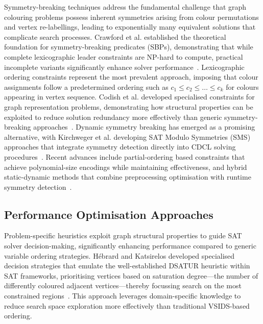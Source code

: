 Symmetry-breaking techniques address the fundamental challenge that graph colouring problems possess inherent symmetries arising from colour permutations and vertex re-labellings, leading to exponentially many equivalent solutions that complicate search processes. Crawford et al. established the theoretical foundation for symmetry-breaking predicates (SBPs), demonstrating that while complete lexicographic leader constraints are NP-hard to compute, practical incomplete variants significantly enhance solver performance~\cite{crawford1996symmetry}. Lexicographic ordering constraints represent the most prevalent approach, imposing that colour assignments follow a predetermined ordering such as $c_1 \leq c_2 \leq \ldots \leq c_k$ for colours appearing in vertex sequence. Codish et al. developed specialised constraints for graph representation problems, demonstrating how structural properties can be exploited to reduce solution redundancy more effectively than generic symmetry-breaking approaches~\cite{codish2018constraints}. Dynamic symmetry breaking has emerged as a promising alternative, with Kirchweger et al. developing SAT Modulo Symmetries (SMS) approaches that integrate symmetry detection directly into CDCL solving procedures~\cite{kirchweger2021sat}. Recent advances include partial-ordering based constraints that achieve polynomial-size encodings while maintaining effectiveness, and hybrid static-dynamic methods that combine preprocessing optimisation with runtime symmetry detection~\cite{schaafsma2009dynamic}.

\subsection{Performance Optimisation Approaches}

Problem-specific heuristics exploit graph structural properties to guide SAT solver decision-making, significantly enhancing performance compared to generic variable ordering strategies. Hébrard and Katsirelos developed specialised decision strategies that emulate the well-established DSATUR heuristic within SAT frameworks, prioritising vertices based on saturation degree—the number of differently coloured adjacent vertices—thereby focussing search on the most constrained regions~\cite{hebrard2020constraint}. This approach leverages domain-specific knowledge to reduce search space exploration more effectively than traditional VSIDS-based ordering.

